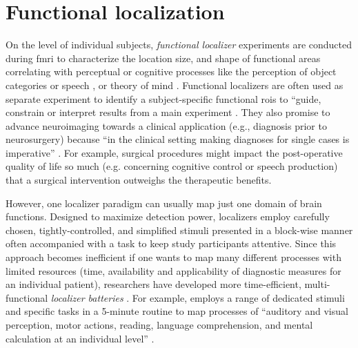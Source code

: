 \section{Functional localization}

On the level of individual subjects, \textit{functional localizer} experiments
\citep[e.g.,][for reviews]{saxe2006divide, friston2006critique} are conducted
during \ac{fmri} to characterize the location size, and shape of functional
areas correlating with perceptual or cognitive processes like the perception of
object categories \citep{kanwisher1997ffa} or speech
\citep{fernandez2001language}, or theory of mind \citep{spunt2014validating}.
Functional localizers are often used as separate experiment to identify a
subject-specific functional \acp{roi} to ``guide, constrain or interpret results
from a main experiment \citep{saxe2006divide}.
They also promise to advance neuroimaging towards a clinical application (e.g.,
diagnosis prior to neurosurgery) because ``in the clinical setting making
diagnoses for single cases is imperative'' \citep{wegrzyn2018thought}.
For example, surgical procedures might impact the post-operative quality of life
so much (e.g. concerning cognitive control or speech production) that a surgical
intervention outweighs the therapeutic benefits.

However, one localizer paradigm can usually map just one domain of brain
functions.
Designed to maximize detection power, localizers employ carefully chosen,
tightly-controlled, and simplified stimuli presented in a block-wise manner
often accompanied with a task to keep study participants attentive.
Since this approach becomes inefficient if one wants to map many different
processes with limited resources (time, availability and applicability of
diagnostic measures for an individual patient), researchers have developed more
time-efficient, multi-functional \textit{localizer batteries}
\citep{barch2013function, drobyshevsky2006rapid, pinho2018individual,
pinho2020individual, pinel2007fast}.
For example, \citet{pinel2007fast} employs a range of dedicated stimuli and
specific tasks in a 5-minute routine to map processes of ``auditory and visual
perception, motor actions, reading, language comprehension, and mental
calculation at an individual level'' \citep{pinel2007fast}.

